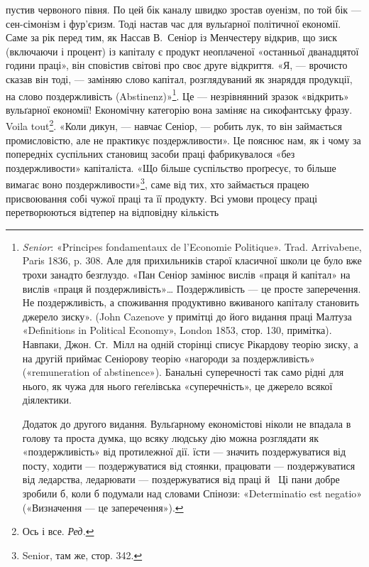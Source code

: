\parcont{}  %
пустив червоного півня. По цей бік каналу швидко зростав оуенізм,
по той бік — сен-сімонізм і фур'єризм. Тоді настав час
для вульґарної політичної економії. Саме за рік перед тим, як
Нассав В.~Сеніор із Менчестеру відкрив, що зиск (включаючи
і процент) із капіталу є продукт неоплаченої «останньої дванадцятої
години праці», він сповістив світові про своє друге відкриття.
«Я, — врочисто сказав він тоді, — заміняю слово капітал,
розглядуваний як знаряддя продукції, на слово поздержливість
(Abstinenz)»\footnote{
\emph{Senior}: «Principes fondamentaux de l’Economie Politique». Trad.
Arrivabene, Paris 1836, p. 308. Але для прихильників старої класичної
школи це було вже трохи занадто безглуздо. «Пан Сеніор замінює вислів
«праця й капітал» на вислів «праця й поздержливість»\dots{} Поздержливість
— це просте заперечення. Не поздержливість, а споживання продуктивно
вживаного капіталу становить джерело зиску». (John Cazenove
у примітці до його видання праці Малтуза «Definitions in Political
Economy», London 1853, стор. 130, примітка). Навпаки, Джон. Ст.~Мілл на одній сторінці списує Рікардову теорію зиску, а на другій приймає
Сеніорову теорію «нагороди за поздержливість» («remuneration
of abstinence»). Банальні суперечності так само рідні для нього, як чужа
для нього геґелівська «суперечність», це джерело всякої діялектики.

Додаток до другого видання. Вульґарному економістові ніколи не
впадала в голову та проста думка, що всяку людську дію можна розглядати
як «поздержливість» від протилежної дії. їсти — значить поздержуватися
від посту, ходити — поздержуватися від стоянки, працювати —
поздержуватися від ледарства, ледарювати — поздержуватися від праці
й~ Ці пани добре зробили б, коли б подумали над словами Спінози:
«Determinatio est negatio» («Визначення — це заперечення»).
}. Це — незрівнянний зразок «відкрить» вульґарної
економії! Економічну категорію вона заміняє на сикофантську
фразу. Voila tout\footnote*{
Ось і все. \emph{Ред.}
}. «Коли дикун, — навчає Сеніор, — робить
лук, то він займається промисловістю, але не практикує
поздержливости». Це пояснює нам, як і чому за попередніх суспільних
становищ засоби праці фабрикувалося «без поздержливости»
капіталіста. «Що більше суспільство проґресує, то більше
вимагає воно поздержливости»\footnote{
Senior, там же, стор. 342.
}, саме від тих, хто займається
працею присвоювання собі чужої праці та її продукту. Всі умови
процесу праці перетворюються відтепер на відповідну кількість
